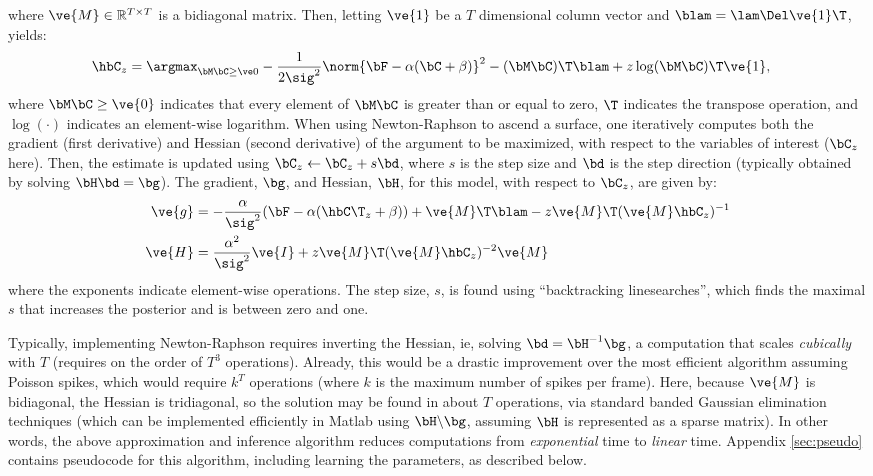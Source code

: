 \noindent where $\ve{M} \in \mathbb{R}^{T \times T}$ is a bidiagonal matrix.  Then, letting $\ve{1}$ be a $T$ dimensional column vector and $\blam=\lam \Del \ve{1}\T$, yields: 
\begin{align} 
\hbC_{\zzz} 
&= \az  -\frac{1}{2 \sig^2} \norm{\bF - \alpha (\bC +\beta)}^2 - (\bM \bC )\T \blam  + \zzz \log(\bM \bC)\T\ve{1},  \label{eq:eta3}
\end{align}
\noindent where $\bM \bC \geq \ve{0}$ indicates that every element of $\bM \bC$ is greater than or equal to zero, $\T$ indicates the transpose operation, and $\log(\cdot)$ indicates an element-wise logarithm. When using Newton-Raphson to ascend a surface, one iteratively computes both the gradient (first derivative) and Hessian (second derivative) of the argument to be maximized, with respect to the variables of interest ($\bC_z$ here).  Then, the estimate is updated using $\bC_z \leftarrow \bC_z + s \bd$, where $s$ is the step size and $\bd$ is the step direction (typically obtained by solving $\bH \bd = \bg$).  The gradient, $\bg$, and Hessian, $\bH$, for this model, with respect to $\bC_z$, are given by:
\begin{subequations} \label{eq:NR}
\begin{align}
\ve{g} &= -\frac{\alpha}{\sig^2}(\bF -\alpha({\hbC\T}_{\zzz} + \beta)) + \ve{M}\T\blam - \zzz \ve{M}\T (\ve{M} \hbC_{\zzz})^{-1} \label{eq:g} \\
\ve{H} &= \frac{\alpha^2}{\sig^2} \ve{I} + \zzz \ve{M}\T (\ve{M} \hbC_{\zzz})^{-2} \ve{M} \label{eq:H}
\end{align}
\end{subequations}
\noindent where the exponents indicate element-wise operations. The step size, $s$, is found using ``backtracking linesearches'', which finds the maximal $s$ that increases the posterior and is between zero and one.

Typically, implementing Newton-Raphson requires inverting the Hessian, ie, solving $\bd = \bH^{-1} \bg$, a computation that scales \emph{cubically} with $T$ (requires on the order of $T^3$ operations). Already, this would be a drastic improvement over the most efficient algorithm assuming Poisson spikes, which would require $k^T$ operations (where $k$ is the maximum number of spikes per frame).  Here, because $\ve{M}$ is bidiagonal, the Hessian is tridiagonal, so the solution may be found in about $T$ operations, via standard banded Gaussian elimination techniques (which can be implemented efficiently in Matlab using $\bH \backslash \bg$, assuming $\bH$ is represented as a sparse matrix). In other words, the above approximation and inference algorithm reduces computations from \emph{exponential} time to \emph{linear} time.  Appendix \ref{sec:pseudo} contains pseudocode for this algorithm, including learning the parameters, as described below.





